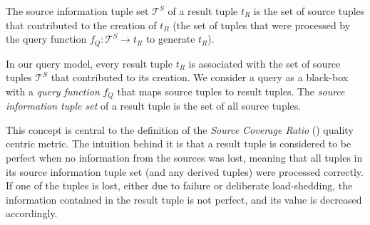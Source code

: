 \begin{definition} 
The source information tuple set $\mathcal{T}^{S}$ of a result tuple $t_{R}$ is the set of source tuples
that contributed to the creation of $t_{R}$ (\ie the set of tuples that were processed by the query
function $f_Q : \mathcal{T}^{S} \rightarrow t_{R}$ to generate $t_{R}$).
\end{definition}
In our query model, every result tuple $t_{R}$ is associated with the set of source tuples
$\mathcal{T}^{S}$ that contributed to its creation. We consider a query as a black-box with a \emph{query
function} $f_Q$ that maps source tuples to result tuples. The \textit{source information tuple set} of a
result tuple is the set of all source tuples. 

This concept is central to the definition of the \textit{Source Coverage Ratio} (\sic) quality
centric metric. The intuition behind it is that a result tuple is considered to be perfect when no
information from the sources was lost, meaning that all tuples in its source information tuple set (and
any derived tuples) were processed correctly. If one of the tuples is lost, either due to failure or
deliberate load-shedding, the information contained in the result tuple is not perfect, and its \sic
value is decreased accordingly.

